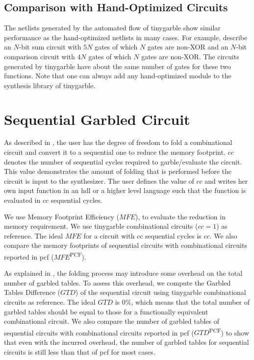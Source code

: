 \subsection{Comparison with Hand-Optimized Circuits}
The netlists generated by the automated flow of \gls{tinygarble} show similar performance as the hand-optimized netlists in many cases.
For example, \cite{kolesnikov2009improved} describe an $N$-bit sum circuit with $5N$ gates of which $N$ gates are non-XOR and an $N$-bit comparison circuit with $4N$ gates of which $N$ gates are non-XOR.
The circuits generated by \gls{tinygarble} have about the same number of gates for these two functions.
Note that one can always add any hand-optimized module to the synthesis library of \gls{tinygarble}.

\section{Sequential Garbled Circuit}
As described in , the user has the degree of freedom to fold a combinational circuit and convert it to a sequential one to reduce the memory footprint.
$cc$ denotes the number of sequential cycles required to garble/evaluate the circuit.
This value demonstrates the amount of folding that is performed before the circuit is input to the synthesizer.
The user defines the value of $cc$ and writes her own input function in an \acrshort{hdl} or a higher level language such that the function is evaluated in $cc$ sequential cycles.

We use Memory Footprint Efficiency ($\mathit{MFE}$), to evaluate the reduction in memory requirement.
We use \gls{tinygarble} combinational circuits ($cc=1$) as reference.
The ideal $\mathit{MFE}$ for a circuit with $cc$ sequential cycles is $cc$.
We also compare the memory footprints of sequential circuits with combinational circuits reported in \gls{pcf} ($\mathit{MFE}$\textsuperscript{PCF}).

As explained in , the folding process may introduce some overhead on the total number of garbled tables.
To assess this overhead, we compute the Garbled Tables Difference ($\mathit{GTD}$) of the sequential circuit using \gls{tinygarble} combinational circuits as reference.
The ideal $\mathit{GTD}$ is $0\%$, which means that the total number of garbled tables should be equal to those for a functionally equivalent combinational circuit.
We also compare the number of garbled tables of sequential circuits with combinational circuits reported in \gls{pcf} ($\mathit{GTD}$\textsuperscript{PCF}) to show that even with the incurred overhead, the number of garbled tables for sequential circuits is still less than that of \gls{pcf} for most cases.

